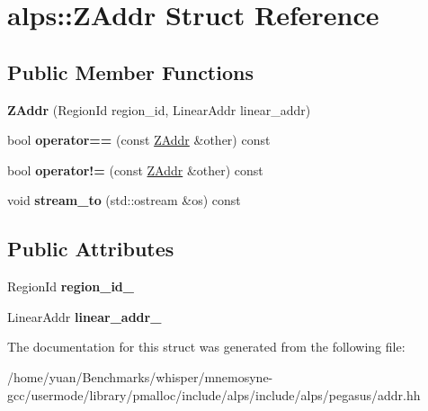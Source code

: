 \hypertarget{structalps_1_1ZAddr}{}\section{alps\+:\+:Z\+Addr Struct Reference}
\label{structalps_1_1ZAddr}
\subsection*{Public Member Functions}
\begin{DoxyCompactItemize}
\item 
{\bfseries Z\+Addr} (Region\+Id region\+\_\+id, Linear\+Addr linear\+\_\+addr)\hypertarget{structalps_1_1ZAddr_a840f3e1c8d7d3010862d34a8a3564c1e}{}\label{structalps_1_1ZAddr_a840f3e1c8d7d3010862d34a8a3564c1e}

\item 
bool {\bfseries operator==} (const \hyperlink{structalps_1_1ZAddr}{Z\+Addr} \&other) const \hypertarget{structalps_1_1ZAddr_a0ba4ee036a59d524e39933b17551426d}{}\label{structalps_1_1ZAddr_a0ba4ee036a59d524e39933b17551426d}

\item 
bool {\bfseries operator!=} (const \hyperlink{structalps_1_1ZAddr}{Z\+Addr} \&other) const \hypertarget{structalps_1_1ZAddr_abe1425d45a5d533cdfcea2c4aad4d011}{}\label{structalps_1_1ZAddr_abe1425d45a5d533cdfcea2c4aad4d011}

\item 
void {\bfseries stream\+\_\+to} (std\+::ostream \&os) const \hypertarget{structalps_1_1ZAddr_a284297341da9a0ce4e25c48e3aec3650}{}\label{structalps_1_1ZAddr_a284297341da9a0ce4e25c48e3aec3650}

\end{DoxyCompactItemize}
\subsection*{Public Attributes}
\begin{DoxyCompactItemize}
\item 
Region\+Id {\bfseries region\+\_\+id\+\_\+}\hypertarget{structalps_1_1ZAddr_a62d32a6de0e86a9638dea97755840067}{}\label{structalps_1_1ZAddr_a62d32a6de0e86a9638dea97755840067}

\item 
Linear\+Addr {\bfseries linear\+\_\+addr\+\_\+}\hypertarget{structalps_1_1ZAddr_a62629dbc06b06d9e6d91bbe313248bcb}{}\label{structalps_1_1ZAddr_a62629dbc06b06d9e6d91bbe313248bcb}

\end{DoxyCompactItemize}


The documentation for this struct was generated from the following file\+:\begin{DoxyCompactItemize}
\item 
/home/yuan/\+Benchmarks/whisper/mnemosyne-\/gcc/usermode/library/pmalloc/include/alps/include/alps/pegasus/addr.\+hh\end{DoxyCompactItemize}
